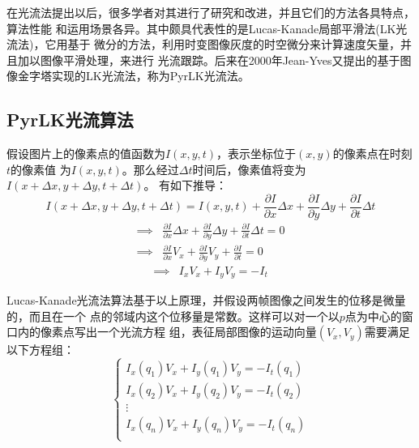 在光流法提出以后，很多学者对其进行了研究和改进，并且它们的方法各具特点，算法性能
和运用场景各异。其中颇具代表性的是Lucas-Kanade局部平滑法(LK光流法)\cite{lk}，它用基于
微分的方法，利用时变图像灰度的时空微分来计算速度矢量，并且加以图像平滑处理，来进行
光流跟踪。后来在2000年Jean-Yves又提出的基于图像金字塔实现的LK光流法，称为PyrLK光流法\cite{pyrlk}。

\subsection{PyrLK光流算法}
\label{subsec:pyrlk}
假设图片上的像素点的值函数为$I(x,y,t)$，表示坐标位于$(x,y)$的像素点在时刻$t$的像素值
为$I(x,y,t)$。那么经过$\Delta t$时间后，像素值将变为$I(x+\Delta x,y+\Delta y, t+\Delta t)$。
有如下推导：\\
\[  I(x+\Delta x,y+\Delta y, t+\Delta t)=I(x,y,t) + \frac{\partial I}{\partial x}\Delta x 
		+ \frac{\partial I}{\partial y}\Delta y + \frac{\partial I}{\partial t}\Delta t \]
\begin{displaymath}
	\begin{array}{cc}
		\implies & \frac{\partial I}{\partial x}\Delta x 
		+ \frac{\partial I}{\partial y}\Delta y + \frac{\partial I}{\partial t}\Delta t = 0\\
		\implies & \frac{\partial I}{\partial x}V_x 
		+ \frac{\partial I}{\partial y}V_y + \frac{\partial I}{\partial t} = 0 
	\end{array}
\end{displaymath}
\begin{equation}\label{eq:opticalflow}
	\begin{array}{cc}
				\implies & I_xV_x + I_yV_y = -I_t
	\end{array}
\end{equation}

Lucas-Kanade光流法算法基于以上原理，并假设两帧图像之间发生的位移是微量的，而且在一个
点的邻域内这个位移量是常数。这样可以对一个以$p$点为中心的窗口内的像素点写出一个光流方程
组，表征局部图像的运动向量$(V_x,V_y)$需要满足以下方程组：\\
\begin{equation}
	\left\{
		\begin{array}{c}
			I_x(q_1)V_x + I_y(q_1)V_y = -I_t(q_1)\\
			I_x(q_2)V_x + I_y(q_2)V_y = -I_t(q_2)\\
			\vdots\\
			I_x(q_n)V_x + I_y(q_n)V_y = -I_t(q_n)\\
		\end{array}
	\right.
\end{equation}

